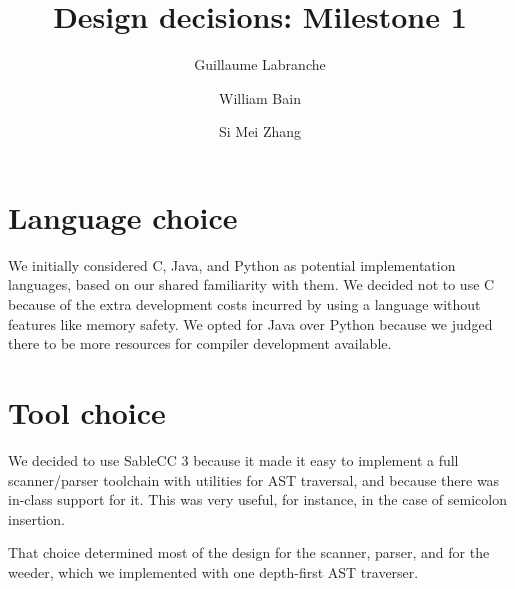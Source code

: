 \documentclass[oneside]{article}
\begin{document}
\title{Design decisions: Milestone 1}
\author{Guillaume Labranche \and William Bain \and Si Mei Zhang}
\maketitle

\section{Language choice}

We initially considered C, Java, and Python as potential implementation languages, based on our shared familiarity with them. We decided not to use C because of the extra development costs incurred by using a language without features like memory safety. We opted for Java over Python because we judged there to be more resources for compiler development available.

\section{Tool choice}

We decided to use SableCC 3 because it made it easy to implement a full scanner/parser toolchain with utilities for AST traversal, and because there was in-class support for it. This was very useful, for instance, in the case of semicolon insertion.

That choice determined most of the design for the scanner, parser, and for the weeder, which we implemented with one depth-first AST traverser.
\end{document}
